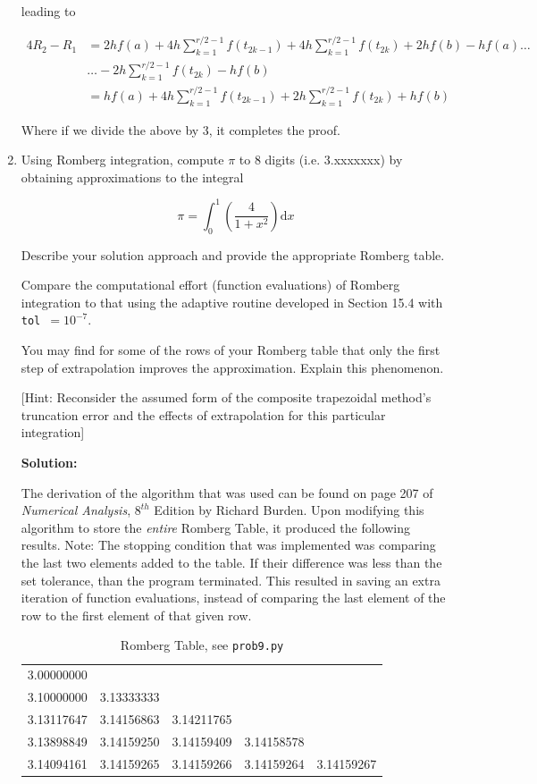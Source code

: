\documentclass[12pt]{article}
\begin{document}
\begin{enumerate}
leading to

\begin{align*}
4R_{2} - R_{1} &= 2hf(a) + 4h\sum_{k=1}^{r/2-1} f(t_{2k-1}) + 4h\sum_{k=1}^{r/2-1}f(t_{2k}) + 2hf(b) - hf(a)\ldots \\
                          &\ldots - 2h\sum_{k=1}^{r/2-1}f(t_{2k}) - hf(b)\\
                          &= hf(a) + 4h\sum_{k=1}^{r/2-1}f(t_{2k-1}) + 2h\sum_{k=1}^{r/2-1} f(t_{2k}) + hf(b)
\end{align*}

Where if we divide the above by 3, it completes the proof.

\item Using Romberg integration, compute $\pi$ to 8 digits (i.e. 3.xxxxxxx) by obtaining approximations to the integral

\[
\pi = \int_{0}^{1}\left( \frac{4}{1 + x^{2}}\right)\text{d}x
\]

Describe your solution approach and provide the appropriate Romberg table.

Compare the computational effort (function evaluations) of Romberg integration to that using the adaptive routine developed in Section 15.4 with {\tt tol}\ $ = 10^{-7}$.

You may find for some of the rows of your Romberg table that only the first step of extrapolation improves the approximation. Explain this phenomenon.

[Hint: Reconsider the assumed form of the composite trapezoidal method's truncation error and the effects of extrapolation for this particular integration]

{\bf Solution:}

The derivation of the algorithm that was used can be found on page 207 of {\em Numerical Analysis}, $8^{th}$ Edition by Richard Burden. Upon modifying this algorithm to store the {\em entire} Romberg Table, it produced the following results. Note: The stopping condition that was implemented was comparing the last two elements added to the table. If their difference was less than the set tolerance, than the program terminated. This resulted in saving an extra iteration of function evaluations, instead of comparing the last element of the row to the first element of that given row.


\begin{table}[H]
\centering
\begin{tabular}{c c c c c }
\hline\hline
3.00000000 &  &  &  & \\
3.10000000 & 3.13333333 &  &  & \\
3.13117647 & 3.14156863 & 3.14211765 &  & \\
3.13898849 & 3.14159250 & 3.14159409 & 3.14158578 & \\
3.14094161 & 3.14159265 & 3.14159266 & 3.14159264 & 3.14159267\\
\hline\hline
\end{tabular}
\caption{Romberg Table, see {\tt prob9.py}}
\end{table}


\end{enumerate}
\end{document}
